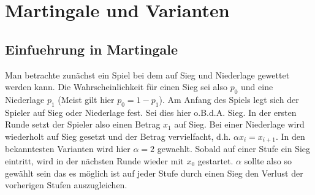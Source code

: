 \documentclass[11pt]{scrartcl}
\begin{document}
	\section{Martingale und Varianten}
		\subsection{Einfuehrung in Martingale}
			Man betrachte zunächst ein Spiel bei dem auf Sieg und Niederlage gewettet werden kann. Die Wahrscheinlichkeit für einen Sieg sei also \(p_{0}\) und eine Niederlage \(p_{1}\) (Meist gilt hier \(p_{0} = 1-p_{1}\)). Am Anfang des Spiels legt sich der Spieler auf Sieg oder Niederlage fest. Sei dies hier o.B.d.A. Sieg. In der ersten Runde setzt der Spieler also einen Betrag \(x_{1}\)  auf Sieg. Bei einer Niederlage wird wiederholt auf Sieg gesetzt und der Betrag vervielfacht, d.h. \(\alpha x_{i} = x_{i+1}\). In den bekanntesten Varianten wird hier \(\alpha = 2\) gewaehlt. Sobald auf einer Stufe ein Sieg eintritt, wird in der nächsten Runde wieder mit \(x_{0}\) gestartet. \(\alpha\) sollte also so gewählt sein das es möglich ist auf jeder Stufe durch einen Sieg den Verlust der vorherigen Stufen auszugleichen.
\end{document}
